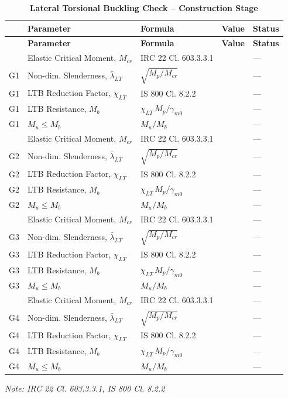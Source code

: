 \documentclass[12pt,a4paper]{report}
\numberwithin{table}{chapter}
\numberwithin{figure}{chapter}
\newcommand{\ReportTableGap}{\vspace{1em}}
\begin{document}
\ReportTableGap
\begin{longtable}{|C{2.5cm}|C{3.5cm}|C{3.5cm}|>{\centering\arraybackslash}p{4.2cm}|C{1.8cm}|}
\caption{\textbf{Lateral Torsional Buckling Check -- Construction Stage}}\\
\hline
\textbf{} & \textbf{Parameter} & \textbf{Formula} & \textbf{Value} & \textbf{Status} \\[6pt]
\hline
\endfirsthead
\hline
\textbf{} & \textbf{Parameter} & \textbf{Formula} & \textbf{Value} & \textbf{Status} \\[6pt]
\hline
\endhead

 & Elastic Critical Moment, $M_{cr}$ & IRC 22 Cl. 603.3.3.1 &  & --- \\[6pt]
G1 & Non-dim. Slenderness, $\bar{\lambda}_{LT}$ & $\sqrt{M_p / M_{cr}}$ &  & --- \\[6pt]
G1 & LTB Reduction Factor, $\chi_{LT}$ & IS 800 Cl. 8.2.2 &  & --- \\[6pt]
G1 & LTB Resistance, $M_b$ & $\chi_{LT}\,M_p / \gamma_{m0}$ &  & --- \\[6pt]
G1 & $M_u \leq M_b$ & $M_u / M_b$ &  & --- \\[6pt]
\hline
{} & Elastic Critical Moment, $M_{cr}$ & IRC 22 Cl. 603.3.3.1 &  & --- \\[6pt]
G2 & Non-dim. Slenderness, $\bar{\lambda}_{LT}$ & $\sqrt{M_p / M_{cr}}$ &  & --- \\[6pt]
G2 & LTB Reduction Factor, $\chi_{LT}$ & IS 800 Cl. 8.2.2 &  & --- \\[6pt]
G2 & LTB Resistance, $M_b$ & $\chi_{LT}\,M_p / \gamma_{m0}$ &  & --- \\[6pt]
G2 & $M_u \leq M_b$ & $M_u / M_b$ &  & --- \\[6pt]
\hline
{} & Elastic Critical Moment, $M_{cr}$ & IRC 22 Cl. 603.3.3.1 &  & --- \\[6pt]
G3 & Non-dim. Slenderness, $\bar{\lambda}_{LT}$ & $\sqrt{M_p / M_{cr}}$ &  & --- \\[6pt]
G3 & LTB Reduction Factor, $\chi_{LT}$ & IS 800 Cl. 8.2.2 &  & --- \\[6pt]
G3 & LTB Resistance, $M_b$ & $\chi_{LT}\,M_p / \gamma_{m0}$ &  & --- \\[6pt]
G3 & $M_u \leq M_b$ & $M_u / M_b$ &  & --- \\[6pt]
\hline
{} & Elastic Critical Moment, $M_{cr}$ & IRC 22 Cl. 603.3.3.1 &  & --- \\[6pt]
G4 & Non-dim. Slenderness, $\bar{\lambda}_{LT}$ & $\sqrt{M_p / M_{cr}}$ &  & --- \\[6pt]
G4 & LTB Reduction Factor, $\chi_{LT}$ & IS 800 Cl. 8.2.2 &  & --- \\[6pt]
G4 & LTB Resistance, $M_b$ & $\chi_{LT}\,M_p / \gamma_{m0}$ &  & --- \\[6pt]
G4 & $M_u \leq M_b$ & $M_u / M_b$ &  & --- \\[6pt]
\hline
\end{longtable}
\noindent\textit{Note: IRC 22 Cl. 603.3.3.1, IS 800 Cl. 8.2.2}
\end{document}
